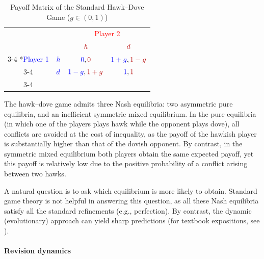 \documentclass[12pt]{article}
\numberwithin{equation}{section}
\numberwithin{figure}{section}
\theoremstyle{definition}
\theoremstyle{plain}
\theoremstyle{plain}
\theoremstyle{plain}
\theoremstyle{remark}
\theoremstyle{plain}
\theoremstyle{plain}
\begin{document}
\begin{table}
\begin{centering}
\caption{Payoff Matrix of the Standard Hawk--Dove Game ($g\in\left(0,1\right)$) \label{tab:canonical-Hawk--dove-Games-1}}
\par\end{centering}
\smallskip{}
\centering
    \setlength{\extrarowheight}{2pt}
    \begin{tabular}{cc|c|c|}
      & \multicolumn{1}{c}{} & \multicolumn{2}{c}{\textcolor{red}{Player 2}}\\
      & \multicolumn{1}{c}{} & \multicolumn{1}{c}{$\textcolor{red}{h}$}  & \multicolumn{1}{c}{$\textcolor{red}{d}$} \\\cline{3-4}
      \multirow{2}*{\textcolor{blue}{Player 1}}  & $\textcolor{blue}{h}$ & $\textcolor{blue}{0},\textcolor{red}{0}$ & $\textcolor{blue}{1+g},\textcolor{red}{1-g}$ \\\cline{3-4}
      & $\textcolor{blue}{d}$ & $\textcolor{blue}{1-g},\textcolor{red}{1+g}$ & $\textcolor{blue}{1},\textcolor{red}{1}$ \\\cline{3-4}
    \end{tabular}
  \end{table}

The hawk–dove game admits three Nash equilibria: two asymmetric pure equilibria, and 
an inefficient symmetric mixed equilibrium. In the pure equilibria (in which one of the players plays hawk while the opponent plays dove), all conflicts are avoided at the cost of inequality, as the payoff of the hawkish player is substantially higher than that of the dovish opponent. By contrast, in the symmetric mixed equilibrium 
both players obtain the same expected payoff,
yet this payoff is relatively low due to the positive probability of a conflict arising between two hawks. 

A natural question is to ask which equilibrium is more likely to obtain. Standard game theory is not helpful in answering this question, as all these Nash equilibria satisfy all the standard refinements (e.g., perfection). By contrast, the dynamic (evolutionary) approach can yield sharp predictions (for textbook expositions, see \citealp{weibull1997evolutionary,sandholm2010population}).

\paragraph{Revision dynamics}
\end{document}
